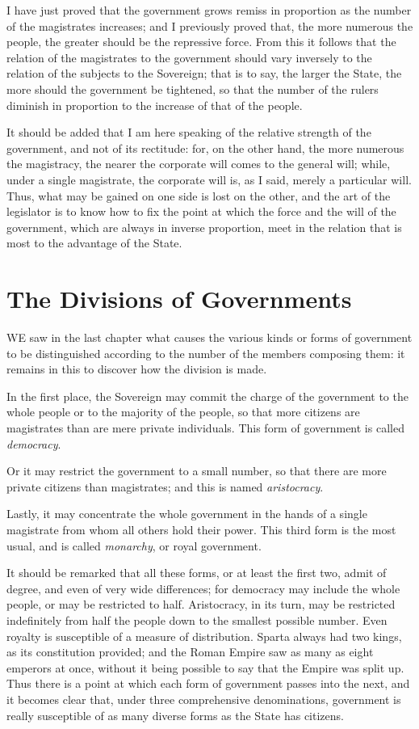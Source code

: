 \documentclass[12pt]{book}
\begin{document}
I have just proved that the government grows remiss in proportion as the number of the magistrates increases; and I previously proved that, the more numerous the people, the greater should be the repressive force. From this it follows that the relation of the magistrates to the government should vary inversely to the relation of the subjects to the Sovereign; that is to say, the larger the State, the more should the government be tightened, so that the number of the rulers diminish in proportion to the increase of that of the people.

It should be added that I am here speaking of the relative strength of the government, and not of its rectitude: for, on the other hand, the more numerous the magistracy, the nearer the corporate will comes to the general will; while, under a single magistrate, the corporate will is, as I said, merely a particular will. Thus, what may be gained on one side is lost on the other, and the art of the legislator is to know how to fix the point at which the force and the will of the government, which are always in inverse proportion, meet in the relation that is most to the advantage of the State.
\clearpage
\section{The Divisions of Governments}
WE saw in the last chapter what causes the various kinds or forms of government to be distinguished according to the number of the members composing them: it remains in this to discover how the division is made.

In the first place, the Sovereign may commit the charge of the government to the whole people or to the majority of the people, so that more citizens are magistrates than are mere private individuals. This form of government is called \textit{democracy}.

Or it may restrict the government to a small number, so that there are more private citizens than magistrates; and this is named \textit{aristocracy}.

Lastly, it may concentrate the whole government in the hands of a single magistrate from whom all others hold their power. This third form is the most usual, and is called \textit{monarchy}, or royal government.

It should be remarked that all these forms, or at least the first two, admit of degree, and even of very wide differences; for democracy may include the whole people, or may be restricted to half. Aristocracy, in its turn, may be restricted indefinitely from half the people down to the smallest possible number. Even royalty is susceptible of a measure of distribution. Sparta always had two kings, as its constitution provided; and the Roman Empire saw as many as eight emperors at once, without it being possible to say that the Empire was split up. Thus there is a point at which each form of government passes into the next, and it becomes clear that, under three comprehensive denominations, government is really susceptible of as many diverse forms as the State has citizens.
\end{document}
